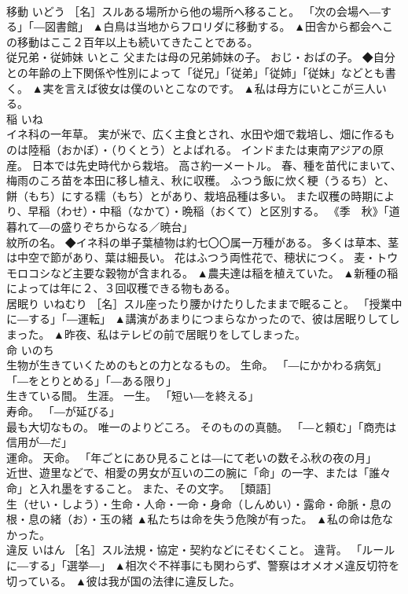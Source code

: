 \documentclass[8pt]{extreport}
\begin{document}
\begin{CJK}{UTF8}{min}
\\	移動	いどう	［名］スルある場所から他の場所へ移ること。 「次の会場へ―する」「―図書館」	▲白鳥は当地からフロリダに移動する。 ▲田舎から都会へこの移動はここ２百年以上も続いてきたことである。
\\	従兄弟・従姉妹	いとこ	父または母の兄弟姉妹の子。 おじ・おばの子。 ◆自分との年齢の上下関係や性別によって「従兄」「従弟」「従姉」「従妹」などとも書く。	▲実を言えば彼女は僕のいとこなのです。 ▲私は母方にいとこが三人いる。
\\	稲	いね	
\\	イネ科の一年草。 実が米で、広く主食とされ、水田や畑で栽培し、畑に作るものは陸稲（おかぼ）・（りくとう）とよばれる。 インドまたは東南アジアの原産。 日本では先史時代から栽培。 高さ約一メートル。 春、種を苗代にまいて、梅雨のころ苗を本田に移し植え、秋に収穫。 ふつう飯に炊く粳（うるち）と、餅（もち）にする糯（もち）とがあり、栽培品種は多い。 また収穫の時期により、早稲（わせ）・中稲（なかて）・晩稲（おくて）と区別する。 《季　秋》「道暮れて―の盛りぞちからなる／暁台」 
\\	紋所の名。 ◆イネ科の単子葉植物は約七〇〇属一万種がある。 多くは草本、茎は中空で節があり、葉は細長い。 花はふつう両性花で、穂状につく。 麦・トウモロコシなど主要な穀物が含まれる。	▲農夫達は稲を植えていた。 ▲新種の稲によっては年に２、３回収穫できる物もある。
\\	居眠り	いねむり	［名］スル座ったり腰かけたりしたままで眠ること。 「授業中に―する」「―運転」	▲講演があまりにつまらなかったので、彼は居眠りしてしまった。 ▲昨夜、私はテレビの前で居眠りをしてしまった。
\\	命	いのち	
\\	生物が生きていくためのもとの力となるもの。 生命。 「―にかかわる病気」「―をとりとめる」「―ある限り」 
\\	生きている間。 生涯。 一生。 「短い―を終える」 
\\	寿命。 「―が延びる」 
\\	最も大切なもの。 唯一のよりどころ。 そのものの真髄。 「―と頼む」「商売は信用が―だ」 
\\	運命。 天命。 「年ごとにあひ見ることは―にて老いの数そふ秋の夜の月」 
\\	近世、遊里などで、相愛の男女が互いの二の腕に「命」の一字、または「誰々命」と入れ墨をすること。 また、その文字。 ［類語］
\\	生（せい・しよう）・生命・人命・一命・身命（しんめい）・露命・命脈・息の根・息の緒（お）・玉の緒	▲私たちは命を失う危険が有った。 ▲私の命は危なかった。
\\	違反	いはん	［名］スル法規・協定・契約などにそむくこと。 違背。 「ルールに―する」「選挙―」	▲相次ぐ不祥事にも関わらず、警察はオメオメ違反切符を切っている。 ▲彼は我が国の法律に違反した。

\end{CJK}
\end{document}
